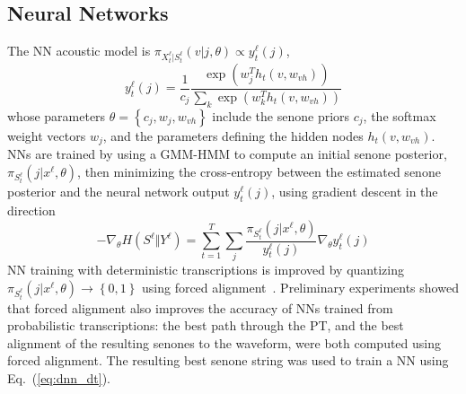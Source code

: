 \subsection{Neural Networks}

The NN acoustic model is $\pi_{X_t^{\ell}|S_t^\ell}(v|j,\theta)\propto y_t^\ell(j)$,
\begin{equation}
y_t^\ell(j)=\frac{1}{c_j}\frac{\exp\left(w_j^Th_t(v,w_{vh})\right)}
{\sum_k \exp\left(w_k^Th_t(v,w_{vh})\right)}
\end{equation}
whose parameters $\theta=\left\{c_j,w_j,w_{vh}\right\}$ include the
senone priors $c_j$, the softmax weight vectors $w_j$, and the
parameters defining the hidden nodes $h_t(v,w_{vh})$.  NNs are
trained by using a GMM-HMM to compute an initial senone posterior,
$\pi_{S_t^{\ell}}(j|x^\ell,\theta)$, then minimizing the cross-entropy
between the estimated senone posterior and the neural network output
$y_{t}^\ell(j)$,
using gradient descent in the direction
\begin{equation}
  -\nabla_\theta H(S^\ell\Vert Y^\ell)=
  \sum_{t=1}^T\sum_j\frac{\pi_{S_t^{\ell}}(j|x^\ell,\theta)}{y_t^\ell(j)}
  \nabla_\theta y_t^\ell(j)
  \label{eq:dnn_dt}
\end{equation}
NN training with deterministic transcriptions is improved by
quantizing $\pi_{S_t^\ell}(j|x^\ell,\theta)\rightarrow\left\{0,1\right\}$
using forced alignment~\cite{Morgan95}. Preliminary experiments showed
that forced alignment also improves the accuracy of NNs trained from
probabilistic transcriptions: the best path through the PT, and the
best alignment of the resulting senones to the waveform, were both
computed using forced alignment.  The resulting best senone string was
used to train a NN using Eq.~(\ref{eq:dnn_dt}).

